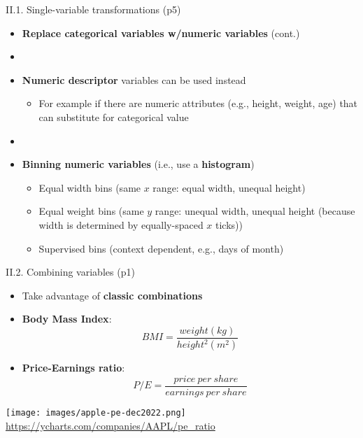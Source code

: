 \documentclass[handout]{beamer}
\newcommand{\strong}[1]{\textbf{\color{teal} #1}}
\newcommand{\stronger}[1]{\textbf{\color{purple} #1}}
\begin{document}
\begin{frame}{II.1. Single-variable transformations (p5)}
\begin{itemize}
\item[] \strong{Replace categorical variables w/numeric variables} (cont.)
\item[]
\item \stronger{Numeric descriptor} variables can be used instead
	\begin{itemize}
	\item For example if there are numeric attributes (e.g., height, weight, age) that can substitute for categorical value
	\end{itemize}
\item[]
\item \strong{Binning numeric variables} (i.e., use a \stronger{histogram})
	\begin{itemize}
	\item Equal width bins (same $x$ range: equal width, unequal height)
	\item Equal weight bins (same $y$ range: unequal width, unequal height (because width is determined by equally-spaced $x$ ticks))
	\item Supervised bins (context dependent, e.g., days of month)
	\end{itemize}
\end{itemize}
\end{frame}
\begin{frame}[fragile]{II.2. Combining variables (p1)}
\begin{itemize}
\item[] Take advantage of \strong{classic combinations}
\item \strong{Body Mass Index}:
\[
	BMI = \frac{weight (kg)}{height^2 (m^2)}
\]
\item \strong{Price-Earnings ratio}:
\[
	P/E = \frac{price ~ per ~ share}{earnings ~ per ~ share}
\]
\end{itemize}
\begin{center}
\texttt{[image: images/apple-pe-dec2022.png]}\\
\footnotesize{\url{https://ycharts.com/companies/AAPL/pe_ratio}}
\end{center}
\end{frame}
\end{document}
